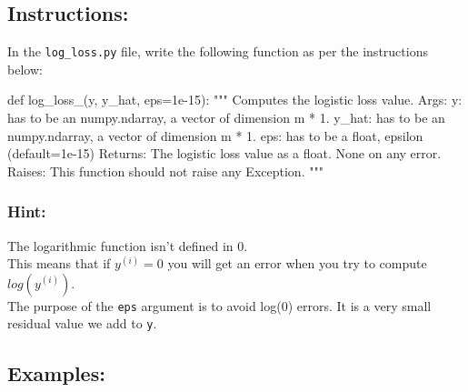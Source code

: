 \documentclass[]{article}
\newenvironment{Shaded}{\begin{snugshade}}{\end{snugshade}}
\newcommand{\CommentTok}[1]{\textcolor[rgb]{0.48,0.49,0.49}{#1}}
\newcommand{\FloatTok}[1]{\textcolor[rgb]{0.96,0.45,0.00}{#1}}
\newcommand{\KeywordTok}[1]{\textcolor[rgb]{0.81,0.81,0.76}{#1}}
\newcommand{\NormalTok}[1]{\textcolor[rgb]{0.81,0.81,0.76}{#1}}
\newcommand{\OperatorTok}[1]{\textcolor[rgb]{0.81,0.81,0.76}{#1}}
\begin{document}
\hypertarget{instructions-4}{%
\subsection{Instructions:}\label{instructions-4}}

In the \texttt{log\_loss.py} file, write the following function as per
the instructions below:

\begin{Shaded}
\begin{Highlighting}[]
\KeywordTok{def}\NormalTok{ log_loss_(y, y_hat, eps}\OperatorTok{=}\FloatTok{1e-15}\NormalTok{):}
    \CommentTok{"""}
\CommentTok{    Computes the logistic loss value.}
\CommentTok{    Args:}
\CommentTok{        y: has to be an numpy.ndarray, a vector of dimension m * 1.}
\CommentTok{        y_hat: has to be an numpy.ndarray, a vector of dimension m * 1.}
\CommentTok{        eps: has to be a float, epsilon (default=1e-15)}
\CommentTok{    Returns:}
\CommentTok{        The logistic loss value as a float.}
\CommentTok{        None on any error.}
\CommentTok{    Raises:}
\CommentTok{        This function should not raise any Exception.}
\CommentTok{    """}
\end{Highlighting}
\end{Shaded}

\hypertarget{hint}{%
\subsubsection{\texorpdfstring{\textbf{Hint:}}{Hint:}}\label{hint}}

The logarithmic function isn't defined in 0.\\
This means that if \(y^{(i)} = 0\) you will get an error when you try to
compute \(log(y^{(i)})\).\\
The purpose of the \texttt{eps} argument is to avoid log(0) errors. It
is a very small residual value we add to \texttt{y}.

\hypertarget{examples-4}{%
\subsection{Examples:}\label{examples-4}}
\end{document}
